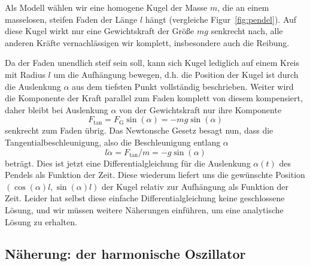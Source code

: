 Als Modell wählen wir eine homogene Kugel der Masse $m$, die an einem
masselosen, steifen Faden der Länge $l$ hängt (vergleiche
Figur~\ref{fig:pendel}). Auf diese Kugel wirkt nur eine Gewichtskraft
der Größe $mg$ senkrecht nach, alle anderen Kräfte vernachlässigen wir
komplett, insbesondere auch die Reibung.

Da der Faden unendlich steif sein soll, kann sich Kugel lediglich auf
einem Kreis mit Radius $l$ um die Aufhängung bewegen, d.h. die
Position der Kugel ist durch die Auslenkung $\alpha$ aus dem tiefsten
Punkt vollständig beschrieben. Weiter wird die Komponente der Kraft
parallel zum Faden komplett von diesem kompensiert, daher bleibt bei
Auslenkung $\alpha$ von der Gewichtskraft nur ihre Komponente
\begin{equation}
  F_\text{tan} = F_\text{G}\sin(\alpha) = -mg\sin(\alpha)
\end{equation}
senkrecht zum Faden übrig. Das Newtonsche Gesetz besagt nun, dass
die Tangentialbeschleunigung, also die Beschleunigung entlang $\alpha$
\begin{equation}
  l\ddot\alpha = F_\text{tan}/m = -g\sin(\alpha)
  \label{eq:pendelgln}
\end{equation}
beträgt. Dies ist jetzt eine Differentialgleichung für die Auslenkung
$\alpha(t)$ des Pendels als Funktion der Zeit. Diese wiederum liefert
uns die gewünschte Position $(\cos(\alpha)l,\sin(\alpha)l)$ der Kugel
relativ zur Aufhängung als Funktion der Zeit. Leider hat selbst diese
einfache Differentialgleichung keine geschlossene Lösung, und wir
müssen weitere Näherungen einführen, um eine analytische Lösung zu
erhalten.

\subsection{Näherung: der harmonische Oszillator}

